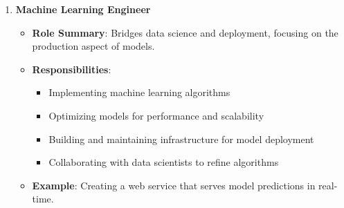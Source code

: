\documentclass[aspectratio=169]{beamer}
\begin{document}
\begin{frame}[fragile]
\begin{enumerate}
        \item \textbf{Machine Learning Engineer}
            \begin{itemize}
                \item \textbf{Role Summary}: Bridges data science and deployment, focusing on the production aspect of models.
                \item \textbf{Responsibilities}:
                    \begin{itemize}
                        \item Implementing machine learning algorithms
                        \item Optimizing models for performance and scalability
                        \item Building and maintaining infrastructure for model deployment
                        \item Collaborating with data scientists to refine algorithms
                    \end{itemize}
                \item \textbf{Example}: Creating a web service that serves model predictions in real-time.
            \end{itemize}
    \end{enumerate}
\end{frame}
\end{document}
